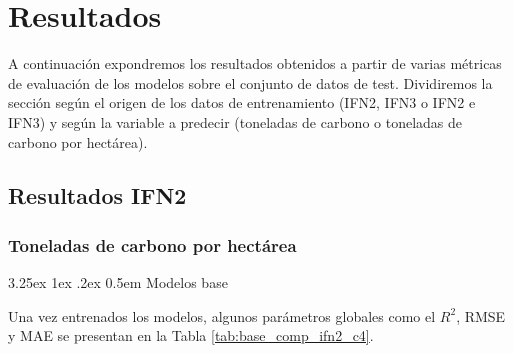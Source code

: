 \documentclass[a4paper,twocolumn]{article}
\makeatletter
\renewcommand\paragraph{\@startsection{paragraph}{4}{\z@}%
  {3.25ex \@plus1ex \@minus.2ex}%
  {0.5em}%
  {\normalfont\normalsize\bfseries}}
\newcommand{\subsubsubsection}[1]{\paragraph{#1}}
\makeatother
\begin{document}
\tableofcontents
\clearpage

\section{Resultados}
\label{sec:resultados}


A continuación expondremos los resultados obtenidos a partir de varias métricas de evaluación de los modelos sobre el conjunto de datos de test. Dividiremos la sección según el origen de los datos de entrenamiento (IFN2, IFN3 o IFN2 e IFN3) y según la variable a predecir (toneladas de carbono o toneladas de carbono por hectárea).

\subsection{Resultados IFN2}

\subsubsection{Toneladas de carbono por hectárea}

\subsubsubsection{Modelos base}

Una vez entrenados los modelos, algunos parámetros globales como el $R^2$, RMSE y MAE se presentan en la Tabla \ref{tab:base_comp_ifn2_c4}.
\end{document}
